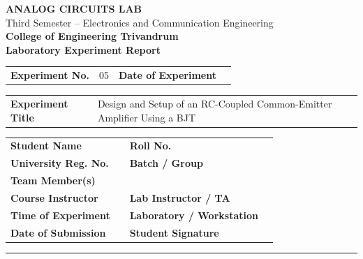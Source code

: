 \documentclass[11pt,a4paper]{article}
\begin{document}
\begin{center}
  {\LARGE\bfseries ANALOG CIRCUITS LAB}\\[1.5mm]
  {\large Third Semester -- Electronics and Communication Engineering}\\[1mm]
  {\large\bfseries College of Engineering Trivandrum}\\[3mm]
  {\Large\bfseries Laboratory Experiment Report}
\end{center}

\vspace{2mm}

\begin{tabularx}{\textwidth}{>{\bfseries}p{36mm} X >{\bfseries}p{36mm} X}
Experiment No. & 05 & Date of Experiment & \hrulefill \\
\end{tabularx}

\begin{tabularx}{\textwidth}{>{\bfseries}p{36mm} X}
Experiment Title & Design and Setup of an RC-Coupled Common-Emitter Amplifier Using a BJT \\
\end{tabularx}

\begin{tabularx}{\textwidth}{>{\bfseries}p{36mm} X >{\bfseries}p{36mm} X}
Student Name & \hrulefill & Roll No. & \hrulefill \\
University Reg. No. & \hrulefill & Batch / Group & \hrulefill \\
Team Member(s) & \multicolumn{3}{X}{\hrulefill} \\
Course Instructor & \hrulefill & Lab Instructor / TA & \hrulefill \\
Time of Experiment & \hrulefill & Laboratory / Workstation & \hrulefill \\
Date of Submission & \hrulefill & Student Signature & \hrulefill \\
\end{tabularx}

\vspace{3mm}
\hrule
\vspace{4mm}
\end{document}
